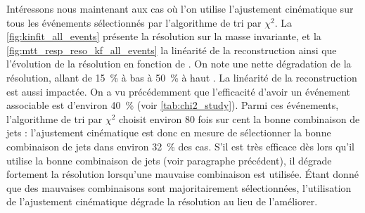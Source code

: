 Intéressons nous maintenant aux cas où l'on utilise l'ajustement cinématique sur tous les événements sélectionnés par l'algorithme de tri par $\chi^2$. La \cref{fig:kinfit_all_events} présente la résolution sur la masse invariante, et la \cref{fig:mtt_resp_reso_kf_all_events} la linéarité de la reconstruction ainsi que l'évolution de la résolution en fonction de \mttgen. On note une nette dégradation de la résolution, allant de \tilde\SI{15}{\%} à bas \mtt à \tilde\SI{50}{\%} à haut \mtt. La linéarité de la reconstruction est aussi impactée. On a vu précédemment que l'efficacité d'avoir un événement associable est d'environ \SI{40}{\%} (voir \cref{tab:chi2_study}). Parmi ces événements, l'algorithme de tri par $\chi^2$ choisit environ \num{80} fois sur cent la bonne combinaison de jets : l'ajustement cinématique est donc en mesure de sélectionner la bonne combinaison de jets dans environ \SI{32}{\%} des cas. S'il est très efficace dès lors qu'il utilise la bonne combinaison de jets (voir paragraphe précédent), il dégrade fortement la résolution lorsqu'une mauvaise combinaison est utilisée. Étant donné que des mauvaises combinaisons sont majoritairement sélectionnées, l'utilisation de l'ajustement cinématique dégrade la résolution au lieu de l'améliorer.

